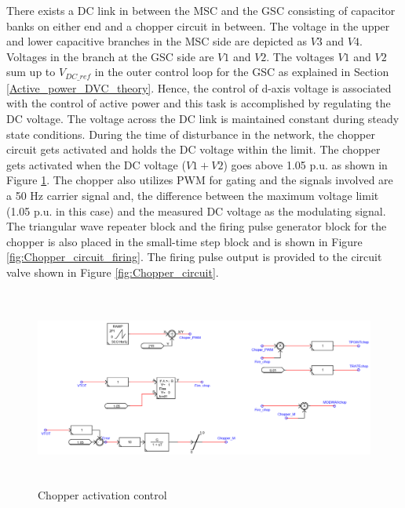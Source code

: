 There exists a \gls{DC} link in between the \gls{MSC} and the \gls{GSC} consisting of capacitor banks on either end and a chopper circuit in between. The voltage in the upper and lower capacitive branches in the \gls{MSC} side are depicted as $V3$ and $V4$. Voltages in the branch at the \gls{GSC} side are $V1$ and $V2$. The voltages $V1$ and $V2$ sum up to $V_{DC\_ref}$ in the outer control loop for the \gls{GSC} as explained in Section \ref{Active_power_DVC_theory}. Hence, the control of d-axis voltage is associated with the control of active power and this task is accomplished by regulating the \gls{DC} voltage. The voltage across the \gls{DC} link is maintained constant during steady state conditions. During the time of disturbance in the network, the chopper circuit gets activated and holds the \gls{DC} voltage within the limit. The chopper gets activated when the \gls{DC} voltage ($V1 + V2$) goes above 1.05 p.u. as shown in Figure \ref{fig:Chopper_circuit_signals}. The chopper also utilizes \gls{PWM} for gating and the signals involved are a 50 Hz carrier signal and, the difference between the maximum voltage limit (1.05 p.u. in this case) and the measured \gls{DC} voltage as the modulating signal. The triangular wave repeater block and the firing pulse generator block for the chopper is also placed in the small-time step block and is shown in Figure \ref{fig:Chopper_circuit_firing}. The firing pulse output is provided to the circuit valve shown in Figure \ref{fig:Chopper_circuit}.

\begin{figure}[H]
\centering
    \includegraphics[height = 6.5cm,width = 16.5cm]{Diagrams/Appendix_A/Chopper_circuit_signals.PNG}
    \caption{Chopper activation control}
    \label{fig:Chopper_circuit_signals}
\end{figure}


